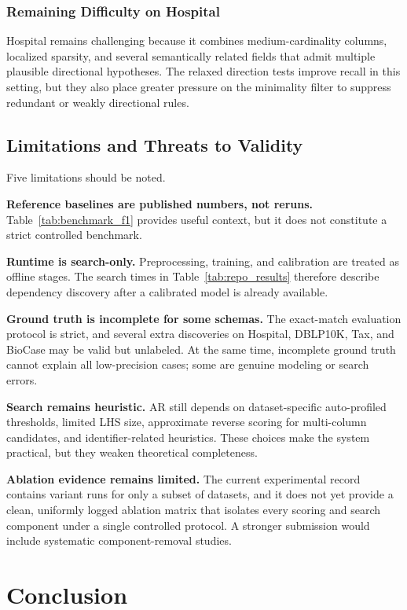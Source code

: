 \documentclass[conference]{IEEEtran}
\begin{document}
\subsubsection{Remaining Difficulty on Hospital}

Hospital remains challenging because it combines medium-cardinality columns, localized sparsity, and several semantically related fields that admit multiple plausible directional hypotheses. The relaxed direction tests improve recall in this setting, but they also place greater pressure on the minimality filter to suppress redundant or weakly directional rules.

\subsection{Limitations and Threats to Validity}

Five limitations should be noted.

\textbf{Reference baselines are published numbers, not reruns.} Table~\ref{tab:benchmark_f1} provides useful context, but it does not constitute a strict controlled benchmark.

\textbf{Runtime is search-only.} Preprocessing, training, and calibration are treated as offline stages. The search times in Table~\ref{tab:repo_results} therefore describe dependency discovery after a calibrated model is already available.

\textbf{Ground truth is incomplete for some schemas.} The exact-match evaluation protocol is strict, and several extra discoveries on Hospital, DBLP10K, Tax, and BioCase may be valid but unlabeled. At the same time, incomplete ground truth cannot explain all low-precision cases; some are genuine modeling or search errors.

\textbf{Search remains heuristic.} AR still depends on dataset-specific auto-profiled thresholds, limited LHS size, approximate reverse scoring for multi-column candidates, and identifier-related heuristics. These choices make the system practical, but they weaken theoretical completeness.

\textbf{Ablation evidence remains limited.} The current experimental record contains variant runs for only a subset of datasets, and it does not yet provide a clean, uniformly logged ablation matrix that isolates every scoring and search component under a single controlled protocol. A stronger submission would include systematic component-removal studies.

\section{Conclusion}\label{sec:conclusion}
\end{document}
